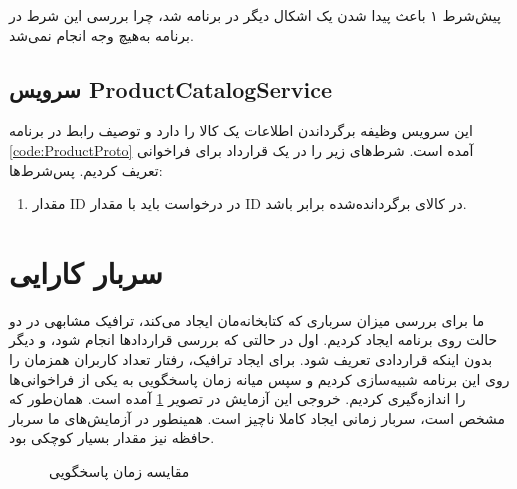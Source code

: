 پیش‌شرط ۱ باعث پیدا شدن یک اشکال دیگر در برنامه شد، چرا بررسی این شرط در برنامه به‌هیچ وجه انجام نمی‌شد.

\subsection{
سرویس ProductCatalogService
}

این سرویس وظیفه برگرداندن اطلاعات یک کالا را دارد و توصیف رابط در برنامه
\ref{code:ProductProto}
آمده است. شرط‌های زیر را در یک قرارداد برای فراخوانی
تعریف کردیم.
پس‌شرط‌ها:
\begin{enumerate}
\item
مقدار ID در درخواست باید با مقدار ID در کالای برگردانده‌شده برابر باشد.
\end{enumerate}

\singlespacing
\begin{figure}
	\begin{LTR}
		
	\end{LTR}
\end{figure}
\doublespacing


\section{سربار کارایی}
ما برای بررسی میزان سرباری که کتابخانه‌مان ایجاد می‌کند، ترافیک مشابهی در دو حالت روی برنامه ایجاد کردیم. اول در حالتی که بررسی قراردادها انجام شود، و دیگر بدون اینکه قراردادی تعریف شود. برای ایجاد ترافیک، رفتار تعداد کاربران همزمان را روی این برنامه شبیه‌سازی کردیم و سپس میانه زمان پاسخگویی به یکی از فراخوانی‌ها را اندازه‌گیری کردیم. خروجی این آزمایش در تصویر
\ref{fig:performance}
آمده است. همان‌طور که مشخص است، سربار زمانی ایجاد کاملا ناچیز است. همینطور در آزمایش‌های ما سربار حافظه نیز مقدار بسیار کوچکی بود.

\begin{figure}[t]
\centering
{}
\caption{مقایسه زمان پاسخگویی}
\label{fig:performance}
\end{figure}
